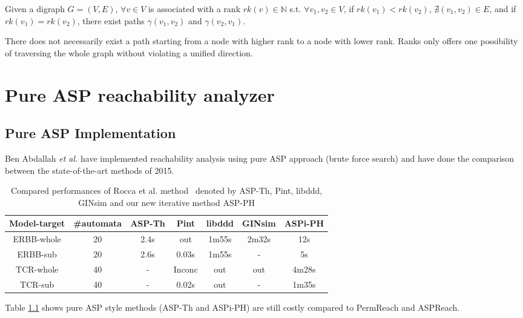 \begin{definition}\label{def:rank}
Given a digraph $G=(V,E)$, $\forall v\in V$ is associated with a rank $rk(v)\in \mathbb{N}$ s.t. $\forall v_1,v_2\in V$, if $rk(v_1)<rk(v_2)$, $\nexists (v_1,v_2)\in E$, and if $rk(v_1)=rk(v_2)$, there exist paths $\gamma(v_1,v_2)$ and $\gamma(v_2,v_1)$.
\end{definition}
\begin{remark}
There does not necessarily exist a path starting from a node with higher rank to a node with lower rank.
Ranks only offers one possibility of traversing the whole graph without violating a unified direction.
\end{remark}


\chapter{Pure ASP reachability analyzer}
\section{Pure ASP Implementation}\label{sec:pureASP}
Ben Abdallah \textit{et al.} \cite{abdallah2015exhaustive} have implemented reachability analysis using pure ASP approach (brute force search) and have done the comparison between the state-of-the-art methods of 2015.

\begin{table}[ht]
    \centering
    \footnotesize
    \begin{tabular}{c|c|c|c|c|c|c}
        Model-target & \#automata & ASP-Th & Pint & libddd & GINsim & ASPi-PH\\
        \hline
        ERBB-whole & 20& 2.4s& out& 1m55s& 2m32s& 12s\\
        \hline
        ERBB-sub& 20& 2.6s& 0.03s& 1m55s& -& 5s\\
        \hline
        TCR-whole& 40& - &Inconc& out& out& 4m28s\\
        \hline
        TCR-sub& 40 &- &0.02s& out& -& 1m35s
    \end{tabular}
    \caption[Performance of pure ASP method]{Compared performances of Rocca et al. method~\cite{rocca2014asp} denoted by ASP-Th, Pint, libddd, GINsim and our new iterative method ASP-PH}
    \label{tab:pureAsp}
\end{table}

Table \ref{tab:pureAsp} shows pure ASP style methods (ASP-Th and ASPi-PH) are still costly compared to PermReach and ASPReach.